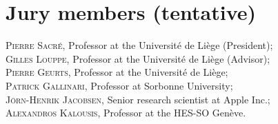 
\chapter*{Jury members (tentative)}


\noindent \textsc{Pierre Sacr{\'e}}, Professor at the Universit{\'e} de Li{\`e}ge (President); \\

\noindent \textsc{Gilles Louppe}, Professor at the Universit{\'e} de Li{\`e}ge (Advisor); \\

\noindent \textsc{Pierre Geurts}, Professor at the Universit{\'e} de Li{\`e}ge; \\

\noindent \textsc{Patrick Gallinari}, Professor at Sorbonne University; \\

\noindent \textsc{J{\"o}rn-Henrik Jacobsen}, Senior research scientist at Apple Inc.; \\

\noindent \textsc{Alexandros Kalousis}, Professor at the HES-SO Gen{\`e}ve. \\
